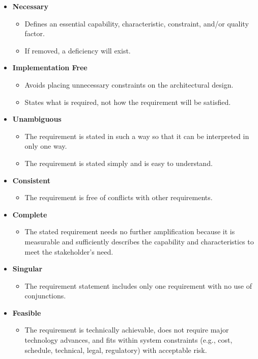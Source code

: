 \documentclass[10pt]{article}
\begin{document}
\begin{multicols}{5}
\begin{block}
\begin{itemize}
  \item \textbf{Necessary}
  \begin{itemize}
    \item Defines an essential capability, characteristic, constraint, and/or quality factor.
    \item If removed, a deficiency will exist.
  \end{itemize}
  \item \textbf{Implementation Free}
  \begin{itemize}
    \item Avoids placing unnecessary constraints on the architectural design.
    \item States what is required, not how the requirement will be satisfied.
  \end{itemize}
  \item \textbf{Unambiguous}
  \begin{itemize}
    \item The requirement is stated in such a way so that it can be interpreted in only one way.
    \item The requirement is stated simply and is easy to understand.
    \end{itemize}
  \item \textbf{Consistent}
  \begin{itemize}
    \item The requirement is free of conflicts with other requirements.
  \end{itemize}
  \item \textbf{Complete}
  \begin{itemize}
    \item The stated requirement needs no further amplification because it is measurable and sufficiently describes the capability and characteristics to meet the stakeholder's need.
  \end{itemize}
  \item \textbf{Singular}
  \begin{itemize}
    \item The requirement statement includes only one requirement with no use of conjunctions.
  \end{itemize}
  \item \textbf{Feasible}
  \begin{itemize}
    \item The requirement is technically achievable, does not require major technology advances, and fits within system constraints (e.g., cost, schedule, technical, legal, regulatory) with acceptable risk.

\end{itemize}
\end{itemize}
\end{block}
\end{multicols}
\end{document}
